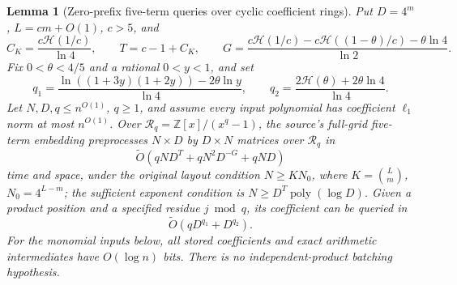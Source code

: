 \documentclass[11pt]{article}
\newtheorem{lemma}[theorem]{Lemma}
\newcommand{\softO}{\widetilde O}
\newcommand{\HH}{\mathcal H}
\begin{document}
\begin{lemma}[Zero-prefix five-term queries over cyclic coefficient rings]
\label{lem:five-zero-prefix-ring}
Put $D=4^m$, $L=cm+O(1)$, $c>5$, and
\[
 C_K=\frac{c\HH(1/c)}{\ln4},\qquad T=c-1+C_K,\qquad
 G=\frac{c\HH(1/c)-c\HH((1-\theta)/c)-\theta\ln4}{\ln2}.
\]
Fix $0<\theta<4/5$ and a rational $0<y<1$, and set
\[
 q_1=\frac{\ln((1+3y)(1+2y))-2\theta\ln y}{\ln4},\qquad
 q_2=\frac{2\HH(\theta)+2\theta\ln4}{\ln4}.
\]
Let $N,D,q\le n^{O(1)}$, $q\ge1$, and assume every input polynomial
has coefficient $\ell_1$ norm at most $n^{O(1)}$. Over
$\mathcal R_q=\mathbb Z[x]/(x^q-1)$, the source's full-grid five-term embedding
preprocesses $N\times D$ by $D\times N$ matrices over $\mathcal R_q$ in
\[
 \softO\left(qND^T+qN^2D^{-G}+qND\right)
\]
time and space, under the original layout condition $N\ge KN_0$, where
$K=\binom Lm$, $N_0=4^{L-m}$; the sufficient exponent condition is
$N\ge D^T\operatorname{poly}(\log D)$.
Given a product position and a specified residue $j\bmod q$, its
coefficient can be queried in
\[
 \softO\left(qD^{q_1}+D^{q_2}\right).
\]
For the monomial inputs below, all stored coefficients and exact
arithmetic intermediates have $O(\log n)$ bits. There is no
independent-product batching hypothesis.
\end{lemma}
\end{document}
